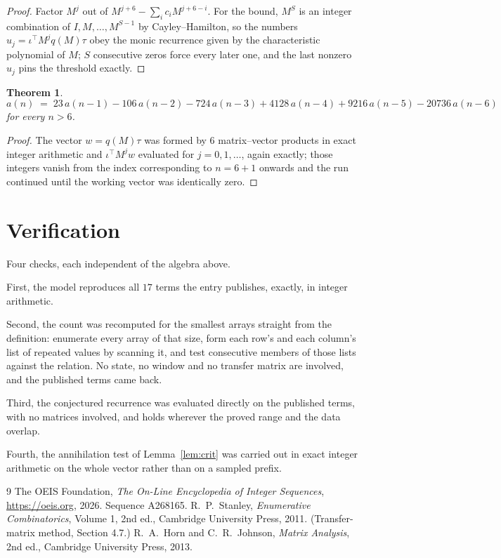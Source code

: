 \documentclass[11pt,a4paper]{article}
\theoremstyle{plain}
\newtheorem{theorem}{Theorem}
\theoremstyle{definition}
\begin{document}
\begin{proof}
Factor $M^{j}$ out of $M^{j+6}-\sum_ic_iM^{j+6-i}$. For the bound, $M^{S}$
is an integer combination of $I,M,\dots,M^{S-1}$ by Cayley--Hamilton, so the numbers
$u_j=\iota^{\!\top}M^{j}q(M)\tau$ obey the monic recurrence given by the characteristic
polynomial of $M$; $S$ consecutive zeros force every later one, and the last nonzero $u_j$
pins the threshold exactly.
\end{proof}

\begin{theorem}
\[
a(n)\;=\;23\,a(n-1) - 106\,a(n-2) - 724\,a(n-3) + 4128\,a(n-4) + 9216\,a(n-5) - 20736\,a(n-6)
\]
for every $n>6$.
\end{theorem}

\begin{proof}
The vector $w=q(M)\tau$ was formed by $6$ matrix--vector products in exact integer
arithmetic and $\iota^{\!\top}M^{j}w$ evaluated for $j=0,1,\dots$, again exactly; those
integers vanish from the index corresponding to $n=6+1$ onwards and the run continued
until the working vector was identically zero.
\end{proof}

\section{Verification}

Four checks, each independent of the algebra above.

First, the model reproduces all $17$ terms the entry publishes, exactly, in integer
arithmetic.

Second, the count was recomputed for the smallest arrays straight from the definition:
enumerate every array of that size, form each row's and each column's list of repeated values
by scanning it, and test consecutive members of those lists against the relation. No state, no
window and no transfer matrix are involved, and the published terms came back.

Third, the conjectured recurrence was evaluated directly on the published terms, with no
matrices involved, and holds wherever the proved range and the data overlap.

Fourth, the annihilation test of Lemma~\ref{lem:crit} was carried out in exact integer
arithmetic on the whole vector rather than on a sampled prefix.

\begin{thebibliography}{9}
 The OEIS Foundation, \emph{The On-Line Encyclopedia of Integer
Sequences}, \url{https://oeis.org}, 2026. Sequence A268165.
 R.~P.~Stanley, \emph{Enumerative Combinatorics}, Volume 1, 2nd ed.,
Cambridge University Press, 2011. (Transfer-matrix method, Section 4.7.)
 R.~A.~Horn and C.~R.~Johnson, \emph{Matrix Analysis}, 2nd ed., Cambridge
University Press, 2013.
\end{thebibliography}
\end{document}
